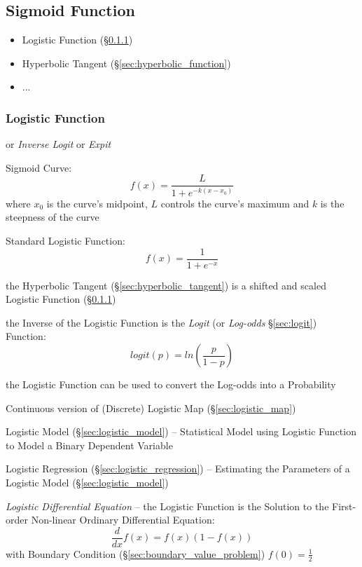 \subsection{Sigmoid Function}\label{sec:sigmoid_function}

\begin{itemize}
  \item Logistic Function (\S\ref{sec:logistic_function})
  \item Hyperbolic Tangent (\S\ref{sec:hyperbolic_function})
  \item ...
\end{itemize}



\subsubsection{Logistic Function}\label{sec:logistic_function}


or \emph{Inverse Logit} or \emph{Expit}

Sigmoid Curve:
\[
  f(x) = \frac{L}{1 + e^{-k(x-x_0)}}
\]
where $x_0$ is the curve's midpoint, $L$ controls the curve's maximum and $k$ is
the steepness of the curve

Standard Logistic Function:
\[
  f(x) = \frac{1}{1 + e^{-x}}
\]

the Hyperbolic Tangent (\S\ref{sec:hyperbolic_tangent}) is a shifted and scaled
Logistic Function (\S\ref{sec:logistic_function})

the Inverse of the Logistic Function is the \emph{Logit} (or \emph{Log-odds}
\S\ref{sec:logit}) Function:
\[
  logit(p) = ln (\frac{p}{1-p})
\]

the Logistic Function can be used to convert the Log-odds into a Probability

\fist Continuous version of (Discrete) Logistic Map (\S\ref{sec:logistic_map})

\fist Logistic Model (\S\ref{sec:logistic_model}) -- Statistical Model using
Logistic Function to Model a Binary Dependent Variable

\fist Logistic Regression (\S\ref{sec:logistic_regression}) -- Estimating the
Parameters of a Logistic Model (\S\ref{sec:logistic_model})

\emph{Logistic Differential Equation} -- the Logistic Function is the Solution
to the First-order Non-linear Ordinary Differential Equation:
\[
  \frac{d}{dx}f(x) = f(x)(1 - f(x))
\]
with Boundary Condition (\S\ref{sec:boundary_value_problem}) $f(0) =
\frac{1}{2}$

